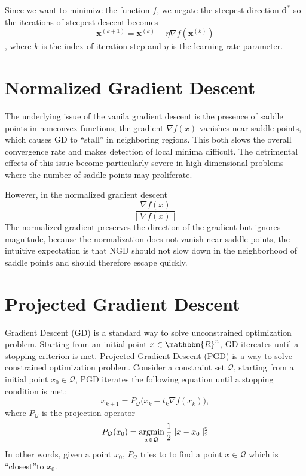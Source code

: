 	Since we want to minimize the function $f$, we negate the steepest direction $\mathbf{d}^{*}$ so the iterations of steepest descent becomes
	$$\mathbf{x}^{(k+1)} = \mathbf{x}^{(k)} - \eta \nabla f(\mathbf{x}^{(k)})$$
	, where $k$ is the index of iteration step and $\eta$ is the learning rate parameter.



\section{Normalized Gradient Descent}

The underlying issue of the vanila gradient descent is the presence of saddle points in nonconvex functions; the gradient $\nabla f(x)$ vanishes near saddle points, which causes GD to ``stall'' in neighboring regions. This both slows the overall convergence rate and makes detection of local minima difficult. The detrimental effects of this issue become particularly severe in high-dimensional problems where the number of saddle points may proliferate.


However, in the normalized gradient descent
$$ \frac{\nabla f(x)}{||\nabla f(x)||}$$
The normalized gradient preserves the direction of the gradient but ignores magnitude, because the normalization does not vanish near saddle points, the intuitive expectation is that NGD should not slow down in the neighborhood of saddle points and should therefore escape quickly. 

\section{Projected Gradient Descent}
Gradient Descent (GD) is a standard way to solve unconstrained optimization problem. Starting from an initial point $x\in \mathbbm{R}^n$, GD itereates until a stopping criterion is met. Projected Gradient Descent (PGD) is a way to solve constrained optimization problem. Consider a constraint set $\mathcal{Q}$, starting from a initial point $x_0 \in \mathcal{Q}$, PGD iterates the following equation until a stopping condition is met:
$$x_{k+1} = P_\mathcal{Q} \Big(x_k - t_k \nabla f(x_k)\Big),$$
where $P_\mathcal{Q}$ is the projection operator
$$P_\mathcal{Q}(x_0) = \operatorname*{\operatorname{argmin}}_{x\in \mathcal{Q}} \frac{1}{2}||x-x_0||^2_2$$
In other words, given a point $x_0$, $P_\mathcal{Q}$ tries to to find a point $x\in \mathcal{Q}$ which is ``closest''to $x_0$.


